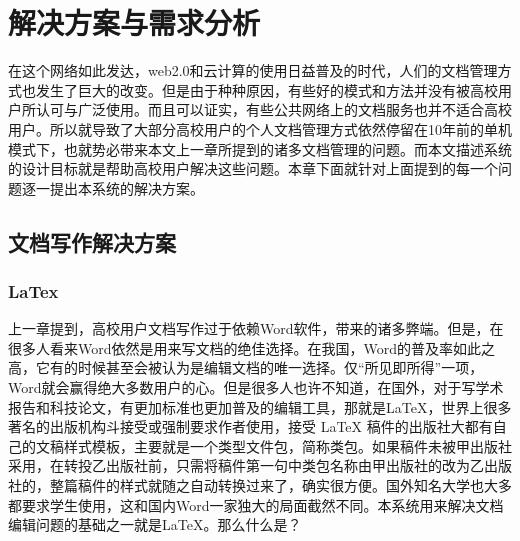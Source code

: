 
\chapter{解决方案与需求分析}
\label{chap:contribute}

在这个网络如此发达，web2.0和云计算的使用日益普及的时代，人们的文档管理方式也发生了巨大的改变。但是由于种种原因，有些好的模式和方法并没有被高校用户所认可与广泛使用。而且可以证实，有些公共网络上的文档服务也并不适合高校用户。所以就导致了大部分高校用户的个人文档管理方式依然停留在10年前的单机模式下，也就势必带来本文上一章所提到的诸多文档管理的问题。而本文描述系统的设计目标就是帮助高校用户解决这些问题。本章下面就针对上面提到的每一个问题逐一提出本系统的解决方案。

\section{文档写作解决方案}
\label{sec:write}

\subsection{LaTex}
\label{sec:latex}

上一章提到，高校用户文档写作过于依赖Word软件，带来的诸多弊端。但是，在很多人看来Word依然是用来写文档的绝佳选择。在我国，Word的普及率如此之高，它有的时候甚至会被认为是编辑文档的唯一选择。仅“所见即所得”一项，Word就会赢得绝大多数用户的心。但是很多人也许不知道，在国外，对于写学术报告和科技论文，有更加标准也更加普及的编辑工具，那就是\LaTeX\cite{tex,SHELL02,companion,dzs2001latex2}，世界上很多著名的出版机构斗接受或强制要求作者使用，接受 LaTeX 稿件的出版社大都有自己的文稿样式模板，主要就是一个类型文件包，简称类包。如果稿件未被甲出版社采用，在转投乙出版社前，只需将稿件第一句中类包名称由甲出版社的改为乙出版社的，整篇稿件的样式就随之自动转换过来了，确实很方便。国外知名大学也大多都要求学生使用，这和国内Word一家独大的局面截然不同。本系统用来解决文档编辑问题的基础之一就是\LaTeX。那么什么是？


